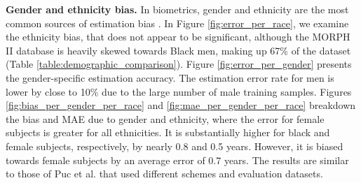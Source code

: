\documentclass[10pt,journal]{IEEEtran}\usepackage{amsfonts}
\begin{document}
\vspace{2mm}\noindent\textbf{Gender and ethnicity bias.} In biometrics, gender
and ethnicity are the most common sources of estimation bias
\cite{robinson2020face}. In Figure \ref{fig:error_per_race}, we examine the
ethnicity bias, that does not appear to be significant, although the MORPH II
database is heavily skewed towards Black men, making up 67\% of the dataset
(Table \ref{table:demographic_comparison}). Figure \ref{fig:error_per_gender}
presents the gender-specific estimation accuracy. The estimation error rate
for men is lower by close to 10\% due to the large number of male training
samples. Figures \ref{fig:bias_per_gender_per_race} and
\ref{fig:mae_per_gender_per_race} breakdown the bias and MAE due to gender and
ethnicity, where the error for female subjects is greater for all ethnicities.
It is substantially higher for black and female subjects, respectively, by
nearly 0.8 and 0.5 years. However, it is biased towards female subjects by an
average error of 0.7 years. The results are similar to those of Puc et al.
\cite{9287219} that used different schemes and evaluation datasets.
\end{document}
